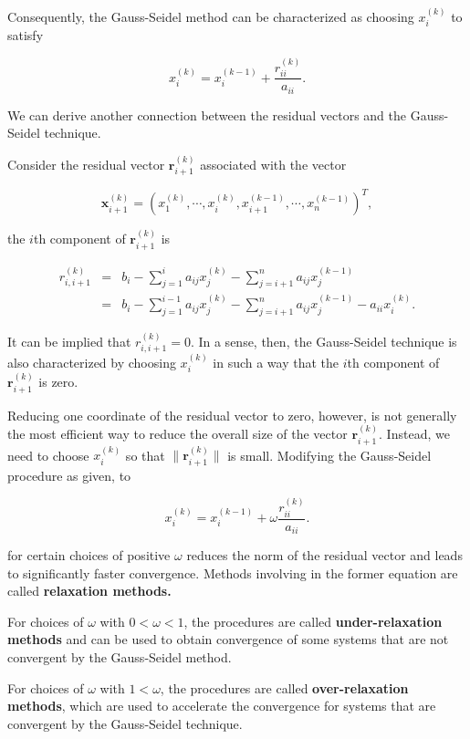 \documentclass[preprint,12pt]{elsarticle}
\begin{document}
Consequently, the Gauss-Seidel method can be characterized as choosing $x_i^{(k)}$ to satisfy

\begin{equation*}
    x_i^{(k)}=x_i^{(k-1)}+\frac{r_{ii}^{(k)}}{a_{ii}}.
\end{equation*}

We can derive another connection between the residual vectors and the Gauss-Seidel technique.

Consider the residual vector $\mathbf{r}_{i+1}^{(k)}$ associated with the vector

\[\mathbf{x}_{i+1}^{(k)}=(x_1^{(k)},\cdots,x_i^{(k)},x_{i+1}^{(k-1)},
\cdots,x_{n}^{(k-1)})^T,\]

the $i$th component of $\mathbf{r}_{i+1}^{(k)}$ is

\begin{eqnarray*}
  r_{i,i+1}^{(k)} &=& b_i- \sum_{j=1}^{i}a_{ij}x_j^{(k)}-\sum_{j=i+1}^n
    a_{ij}x_j^{(k-1)}\\
   &=& b_i- \sum_{j=1}^{i-1}a_{ij}x_j^{(k)}-\sum_{j=i+1}^n
    a_{ij}x_j^{(k-1)}-a_{ii}x_i^{(k)}.
\end{eqnarray*}

It can be implied that $r_{i,i+1}^{(k)} =0$. In a sense, then, the Gauss-Seidel technique is also characterized by choosing  $x_i^{(k)}$ in such a way that the $i$th component of $\mathbf{r}_{i+1}^{(k)}$ is zero.

Reducing one coordinate of the residual vector to zero, however, is not generally the most efficient way to reduce the overall size of the vector $\mathbf{r}_{i+1}^{(k)}$. Instead, we need to choose $x_i^{(k)}$ so that $\|\mathbf{r}_{i+1}^{(k)}\|$ is small. Modifying the Gauss-Seidel procedure as given, to

\begin{equation*}
    x_i^{(k)}=x_i^{(k-1)}+\omega\frac{r_{ii}^{(k)}}{a_{ii}}.
\end{equation*}

for certain choices of positive $\omega$ reduces the norm of the
residual vector and leads to significantly faster convergence. Methods involving in the former equation are called \textbf{relaxation methods.}

For choices of $\omega$ with $0 < \omega < 1$, the procedures are called \textbf{under-relaxation methods} and can be used to obtain convergence of some systems that are not convergent by the Gauss-Seidel method.

For choices of $\omega$ with $1 <\omega$, the procedures are called \textbf{over-relaxation methods}, which are used to accelerate the convergence for systems that are convergent by the Gauss-Seidel technique.
\end{document}
